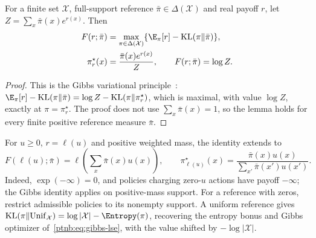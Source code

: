 \begin{lemmaenv}\label{ptnb:lem:kl-legendre-fenchel}
For a finite set $\mathcal X$, full-support reference $\bar\pi\in\Delta(\mathcal X)$ and real payoff $r$, let $Z=\sum_x\bar\pi(x)e^{r(x)}$. Then
\begin{align}
    F(r;\bar\pi)&=\max_{\pi\in\Delta(\mathcal X)}
       \{\E_\pi[r]-\mathrm{KL}(\pi\|\bar\pi)\},\label{ptnb:eq:kl-lf-objective}\\
    \pi_r^\star(x)&=\frac{\bar\pi(x)e^{r(x)}}{Z},
       \qquad F(r;\bar\pi)=\log Z.\label{ptnb:eq:kl-lf-optimizer}
\end{align}
\end{lemmaenv}
\begin{proof}
This is the Gibbs variational principle~\parencite{BoydVandenberghe2004}:
$\E_\pi[r]-\mathrm{KL}(\pi\|\bar\pi)=\log Z-\mathrm{KL}(\pi\|\pi_r^\star)$,
which is maximal, with value $\log Z$, exactly at $\pi=\pi_r^\star$. The proof does not use $\sum_x\bar\pi(x)=1$, so the lemma holds for every finite positive reference measure $\bar\pi$.
\end{proof}
For $u\ge0$, $r=\ell(u)$ and positive weighted mass, the identity extends to
\begin{equation}\label{ptnb:eq:kl-lf-linearized}
    F(\ell(u);\bar\pi)=\ell\!\left(\sum_x\bar\pi(x)u(x)\right),
    \qquad \pi_{\ell(u)}^\star(x)=\frac{\bar\pi(x)u(x)}{\sum_{x'}\bar\pi(x')u(x')}.
\end{equation}
Indeed, $\exp(-\infty)=0$, and policies charging zero-$u$ actions have payoff $-\infty$; the Gibbs identity applies on positive-mass support. For a reference with zeros, restrict admissible policies to its nonempty support. A uniform reference gives $\mathrm{KL}(\pi\|\mathrm{Unif}_{\mathcal X})=\log|\mathcal X|-\Entropy(\pi)$, recovering the entropy bonus and Gibbs optimizer of~\eqref{ptnb:eq:gibbs-lse}, with the value shifted by $-\log|\mathcal X|$.

